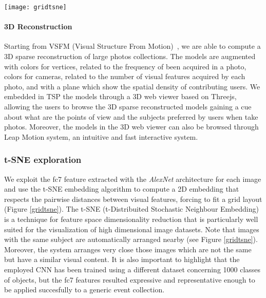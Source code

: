 \begin{figure*}
	\centering
	\texttt{[image: gridtsne]}
	\caption{t-SNE visualization, the images are forced to fit a grid layout. Images of an event are automatically organized by visual content. Images close in the 2D space of the visualization tool are also close in terms of visual content.}
	\label{gridtsne}
\end{figure*}

\paragraph{3D Reconstruction}
Starting from VSFM (Visual Structure From Motion)~\cite{wu2013towards}, we are able to compute a 3D sparse reconstruction of large photos collections. The models are augmented with colors for vertices, related to the frequency of been acquired in a photo, colors for cameras, related to the number of visual features acquired by each photo, and with a plane which show the spatial density of contributing users. We embedded in TSP the models through a 3D web viewer based on Threejs, allowing the users to browse the 3D sparse reconstructed models gaining a cue about what are the points of view and the subjects preferred by users when take photos. Moreover, the models in the 3D web viewer can also be browsed through Leap Motion system, an intuitive and fast interactive system.
\vspace{-0.2cm}


\subsubsection{t-SNE exploration}
We exploit the fc7 feature extracted with the \textit{AlexNet} architecture \cite{krizhevsky2012imagenet} for each image and use the t-SNE embedding algorithm \cite{van2008visualizing} to compute a 2D embedding that respects the pairwise distances between visual features, forcing to fit a grid layout (Figure \ref{gridtsne}). The t-SNE (t-Distribuited Stochastic Neighbour Embedding) is a technique for feature space dimensionality reduction that is particularly well suited for the visualization of high dimensional image datasets.
Note that images with the same subject are automatically arranged nearby (see Figure \ref{gridtsne}). Moreover, the system arranges very close those images which are not the same but have a similar visual content. It is also important to highlight that the employed CNN \cite{krizhevsky2012imagenet} has been trained using a different dataset concerning 1000 classes of objects, but the fc7 features resulted expressive and representative enough to be applied succesfully to a generic event collection.

